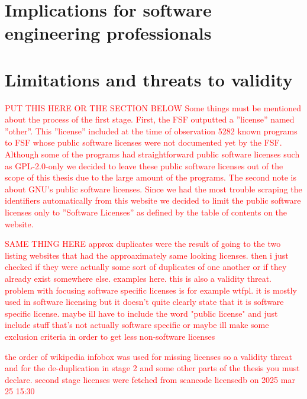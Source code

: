 
\section{Implications for software engineering professionals}




\section{Limitations and threats to validity}

\textcolor{red}{PUT THIS HERE OR THE SECTION BELOW Some things must be mentioned about the process of the first stage. First, the FSF outputted a ''license'' named ''other''. This ''license'' included at the time of observation 5282 known programs to FSF whose public software licenses were not documented yet by the FSF. Although some of the programs had straightforward public software licenses such as GPL-2.0-only we decided to leave these public software licenses out of the scope of this thesis due to the large amount of the programs. The second note is about GNU's public software licenses. Since we had the most trouble scraping the identifiers automatically from this website we decided to limit the public software licenses only to ''Software Licenses'' as defined by the table of contents on the website. }

\textcolor{red}{SAME THING HERE approx duplicates were the result of going to the two listing websites that had the approaximately same looking licenses. then i just checked if they were actually some sort of duplicates of one another or if they already exist somewhere else. examples here. this is also a validity threat. problem with focusing software specific licenses is for example wtfpl. it is mostly used in software licensing but it doesn't quite clearly state that it is software specific license. maybe ill have to include the word "public license" and just include stuff that's not actually software specific or maybe ill make some exclusion criteria in order to get less non-software licenses}

\textcolor{red}{the order of wikipedia infobox was used for missing licenses so a validity threat and for the de-duplication in stage 2 and some other parts of the thesis you must declare. second stage licenses were fetched from scancode licensedb on 2025 mar 25 15:30}

